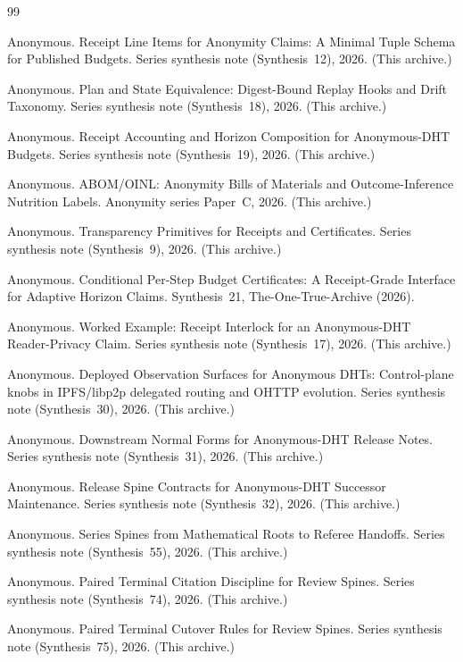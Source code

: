\documentclass[11pt]{article}
\begin{document}
\begin{thebibliography}{99}\small

Anonymous.
\newblock Receipt Line Items for Anonymity Claims: A Minimal Tuple Schema for Published Budgets.
\newblock Series synthesis note (Synthesis~12), 2026. (This archive.)

Anonymous.
\newblock Plan and State Equivalence: Digest-Bound Replay Hooks and Drift Taxonomy.
\newblock Series synthesis note (Synthesis~18), 2026. (This archive.)

Anonymous.
\newblock Receipt Accounting and Horizon Composition for Anonymous-DHT Budgets.
\newblock Series synthesis note (Synthesis~19), 2026. (This archive.)

Anonymous.
\newblock ABOM/OINL: Anonymity Bills of Materials and Outcome-Inference Nutrition Labels.
\newblock Anonymity series Paper~C, 2026. (This archive.)

Anonymous.
\newblock Transparency Primitives for Receipts and Certificates.
\newblock Series synthesis note (Synthesis~9), 2026. (This archive.)

Anonymous.
\newblock Conditional Per-Step Budget Certificates: A Receipt-Grade Interface for Adaptive Horizon Claims.
\newblock Synthesis~21, The-One-True-Archive (2026).

Anonymous.
\newblock Worked Example: Receipt Interlock for an Anonymous-DHT Reader-Privacy Claim.
\newblock Series synthesis note (Synthesis~17), 2026. (This archive.)

Anonymous.
\newblock Deployed Observation Surfaces for Anonymous DHTs: Control-plane knobs in IPFS/libp2p delegated routing and OHTTP evolution.
\newblock Series synthesis note (Synthesis~30), 2026. (This archive.)

Anonymous.
\newblock Downstream Normal Forms for Anonymous-DHT Release Notes.
\newblock Series synthesis note (Synthesis~31), 2026. (This archive.)

Anonymous.
\newblock Release Spine Contracts for Anonymous-DHT Successor Maintenance.
\newblock Series synthesis note (Synthesis~32), 2026. (This archive.)

Anonymous.
\newblock Series Spines from Mathematical Roots to Referee Handoffs.
\newblock Series synthesis note (Synthesis~55), 2026. (This archive.)

Anonymous.
\newblock Paired Terminal Citation Discipline for Review Spines.
\newblock Series synthesis note (Synthesis~74), 2026. (This archive.)

Anonymous.
\newblock Paired Terminal Cutover Rules for Review Spines.
\newblock Series synthesis note (Synthesis~75), 2026. (This archive.)

\end{thebibliography}
\end{document}
